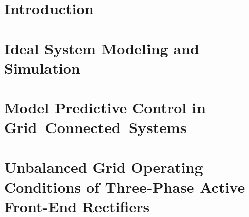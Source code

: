 \documentclass[a4paper,12pt,twoside,openright]{report}
\begin{document}
	
	\setcounter{page}{1}
	
	\clearpage
	\tableofcontents
	
	\clearpage
	\listoftables
	\clearpage
	\listoffigures
	
	\clearpage
	
	\clearpage
	\newpage
	
	
	\newpage
	\setcounter{page}{1}
	\titlespacing{\chapter}{0pt}{24pt}{36pt}
\chapter{Introduction}

\chapter{Ideal System Modeling and Simulation} \label{chap:modeling}

\chapter{Model Predictive Control in Grid~Connected~Systems} \label{chap:mpc}
 
\chapter{Unbalanced Grid Operating Conditions of Three-Phase Active Front-End Rectifiers} \label{chap:results}


\end{document}
